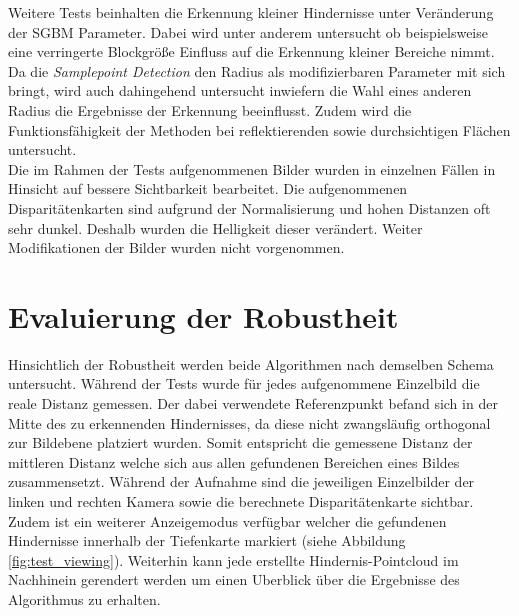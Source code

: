 \noindent
Weitere Tests beinhalten die Erkennung kleiner Hindernisse unter Veränderung der SGBM Parameter. Dabei wird unter anderem untersucht ob beispielsweise eine verringerte Blockgröße Einfluss auf die Erkennung kleiner Bereiche nimmt. Da die \textit{Samplepoint Detection} den Radius als modifizierbaren Parameter mit sich bringt, wird auch dahingehend untersucht inwiefern die Wahl eines anderen Radius die Ergebnisse der Erkennung beeinflusst. Zudem wird die Funktionsfähigkeit der Methoden bei reflektierenden sowie durchsichtigen Flächen untersucht.\\

\noindent
Die im Rahmen der Tests aufgenommenen Bilder wurden in einzelnen Fällen in Hinsicht auf bessere Sichtbarkeit bearbeitet. Die aufgenommenen Disparitätenkarten sind aufgrund der Normalisierung und hohen Distanzen oft sehr dunkel. Deshalb wurden die Helligkeit dieser verändert. Weiter Modifikationen der Bilder wurden nicht vorgenommen.

\section{Evaluierung der Robustheit}
\label{sec:robustness_evaluation}

Hinsichtlich der Robustheit werden beide Algorithmen nach demselben Schema untersucht. Während der Tests wurde für jedes aufgenommene Einzelbild die reale Distanz gemessen. Der dabei verwendete Referenzpunkt befand sich in der Mitte des zu erkennenden Hindernisses, da diese nicht zwangsläufig orthogonal zur Bildebene platziert wurden. Somit entspricht die gemessene Distanz der mittleren Distanz welche sich aus allen gefundenen Bereichen eines Bildes zusammensetzt. Während der Aufnahme sind die jeweiligen Einzelbilder der linken und rechten Kamera sowie die berechnete Disparitätenkarte sichtbar. Zudem ist ein weiterer Anzeigemodus verfügbar welcher die gefundenen Hindernisse innerhalb der Tiefenkarte markiert (siehe Abbildung \ref{fig:test_viewing}). Weiterhin kann jede erstellte Hindernis-Pointcloud im Nachhinein gerendert werden um einen Uberblick über die Ergebnisse des Algorithmus zu erhalten.

